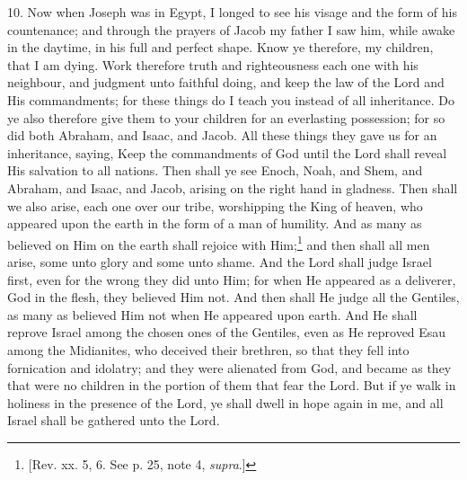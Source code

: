 10. Now when Joseph was in Egypt, I longed to see his visage and the form of his countenance; and through the prayers of Jacob my father I saw him, while awake in the daytime, in his full and perfect shape. Know ye therefore, my children, that I am dying. Work therefore truth and righteousness each one with his neighbour, and judgment unto faithful doing, and keep the law of the Lord and His commandments; for these things do I teach you instead of all inheritance. Do ye also therefore give them to your children for an everlasting possession; for so did both Abraham, and Isaac, and Jacob. All these things they gave us for an inheritance, saying, Keep the commandments of God until the Lord shall reveal His salvation to all nations. Then shall ye see Enoch, Noah, and Shem, and Abraham, and Isaac, and Jacob, arising on the right hand in gladness. Then shall we also arise, each one over our tribe, worshipping the King of heaven, who appeared upon the earth in the form of a man of humility. And as many as believed on Him on the earth shall rejoice with Him;\footnote{[Rev. xx. 5, 6. See p. 25, note 4, \emph{supra}.]} and then shall all men arise, some unto glory and some unto shame. And the Lord shall judge Israel first, even for the wrong they did unto Him; for when He appeared as a deliverer, God in the flesh, they believed Him not. And then shall He judge all the Gentiles, as many as believed Him not when He appeared upon earth. And He shall reprove Israel among the chosen ones of the Gentiles, even as He reproved Esau among the Midianites, who deceived their brethren, so that they fell into fornication and idolatry; and they were alienated from God, and became as they that were no children in the portion of them that fear the Lord. But if ye walk in holiness in the presence of the Lord, ye shall dwell in hope again in me, and all Israel shall be gathered unto the Lord.

